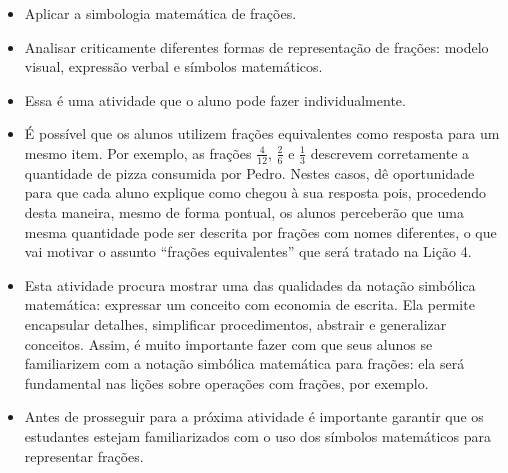 \Bg
\begin{multicols}{2}
  
\begin{objetivos}[label=chap2-ativ6]{}{}
  \begin{itemize} %
\item Aplicar a simbologia matemática de frações.
\item Analisar criticamente diferentes formas de representação de frações: modelo visual, expressão verbal e símbolos matemáticos.
\end{itemize} %

\end{objetivos}

\begin{orientacoes}
  \begin{itemize} %
    \item       Essa é uma atividade que o aluno pode fazer individualmente.
    \item       É possível que os alunos utilizem frações equivalentes como resposta para um mesmo item. Por exemplo, as frações       $\frac{4}{12}$,       $\frac{2}{6}$ e       $\frac{1}{3}$ descrevem corretamente a quantidade de pizza consumida por Pedro. Nestes casos, dê oportunidade para que cada aluno explique como chegou à sua resposta pois, procedendo desta maneira, mesmo de forma pontual, os alunos perceberão que uma mesma quantidade pode ser descrita por frações com nomes diferentes, o que vai motivar o assunto ``frações equivalentes''     que será tratado na Lição 4.
    \item       Esta atividade procura mostrar uma das qualidades da notação simbólica matemática: expressar um conceito com economia de escrita. Ela permite encapsular detalhes, simplificar procedimentos, abstrair e generalizar conceitos. Assim, é muito importante fazer com que seus alunos se familiarizem com a notação simbólica matemática para frações: ela será fundamental nas lições sobre operações com frações, por exemplo.
      \item Antes de prosseguir para a próxima atividade é importante garantir que os estudantes estejam familiarizados com o uso dos símbolos matemáticos para representar frações.
\end{itemize} %



\end{orientacoes}
\end{multicols}
